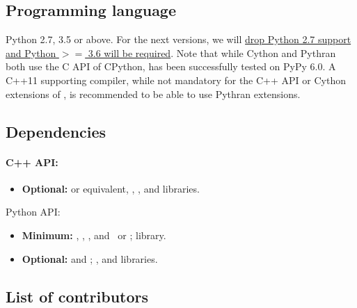 \subsection{Programming language}


Python 2.7, 3.5 or above. For the next versions, we will
\href{https://python3statement.org/}{drop Python 2.7 support and Python $>=$
3.6 will be required}.
%
Note that while Cython and Pythran both use the C API of CPython, 
has been successfully tested on PyPy 6.0.
%
A C++11 supporting compiler, while not mandatory for the C++ API or Cython
extensions of , is recommended to be able to use Pythran extensions.

\subsection{Dependencies}

\paragraph{C++ API:}
\begin{itemize}
  \item{\bf Optional:}  or equivalent, ,
    ,  and  libraries.
\end{itemize}

Python API:

\begin{itemize}
\item {\bf Minimum:} , , , and
  \ or ;  library.
\item {\bf Optional:}  and ; ,
   and  libraries.
\end{itemize}


\subsection{List of contributors}


